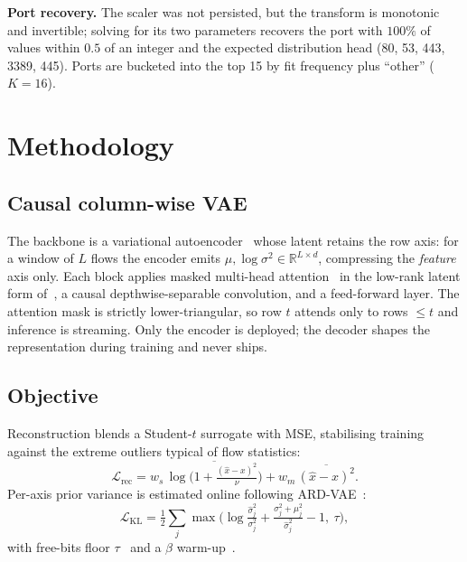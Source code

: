 \documentclass[conference]{IEEEtran}
\begin{document}
\textbf{Port recovery.} The scaler was not persisted, but the transform is monotonic and
invertible; solving for its two parameters recovers the port with $100\%$ of values within
$0.5$ of an integer and the expected distribution head (80, 53, 443, 3389, 445). Ports are
bucketed into the top 15 by fit frequency plus ``other'' ($K=16$).

\section{Methodology}\label{sec:method}

\subsection{Causal column-wise VAE}
The backbone is a variational autoencoder~\cite{kingma2014vae} whose latent retains the row
axis: for a window of $L$ flows the encoder emits $\mu,\log\sigma^2 \in
\mathbb{R}^{L\times d}$, compressing the \emph{feature} axis only. Each block applies masked
multi-head attention~\cite{vaswani2017attention} in the low-rank latent form
of~\cite{deepseekv2}, a causal depthwise-separable convolution, and a feed-forward layer.
The attention mask is strictly lower-triangular, so row $t$ attends only to rows $\leq t$
and inference is streaming. Only the encoder is deployed; the decoder shapes the
representation during training and never ships.

\subsection{Objective}
Reconstruction blends a Student-$t$ surrogate with MSE, stabilising training against the
extreme outliers typical of flow statistics:
\begin{equation}
\mathcal{L}_{\text{rec}} = w_s\,\overline{\log\!\Big(1+\tfrac{(\hat{x}-x)^2}{\nu}\Big)}
                          + w_m\,\overline{(\hat{x}-x)^2}.
\end{equation}
Per-axis prior variance is estimated online following ARD-VAE~\cite{saha2025ardvae}:
\begin{equation}
\mathcal{L}_{\text{KL}} = \tfrac{1}{2}\sum_j \max\!\Big(
  \log\tfrac{\hat{\sigma}^2_j}{\sigma^2_j}
  + \tfrac{\sigma^2_j + \mu_j^2}{\hat{\sigma}^2_j} - 1,\ \tau \Big),
\end{equation}
with free-bits floor $\tau$~\cite{kingma2016iaf} and a $\beta$ warm-up~\cite{higgins2017betavae}.
\end{document}

